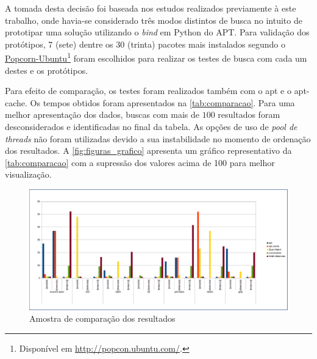 
A tomada desta decisão foi baseada nos estudos realizados previamente à este trabalho, onde havia-se considerado três modos distintos de busca no intuito de prototipar uma solução utilizando o \textit{bind} em Python do {\code APT}.
Para validação dos protótipos, 7 (sete) dentre os 30 (trinta) pacotes mais instalados segundo o \href{http://popcon.ubuntu.com/}{Popcorn-Ubuntu}\footnote{Disponível em \url{http://popcon.ubuntu.com/}.} foram escolhidos para realizar os testes de busca com cada um destes e os protótipos. 

Para efeito de comparação, os testes foram realizados também com o {\code apt} e o {\code apt-cache}. Os tempos obtidos foram apresentados na \autoref{tab:comparacao}. Para uma melhor apresentação dos dados, buscas com mais de $100$  resultados foram desconsiderados e identificadas no final da tabela. As opções de uso de \textit{pool de threads} não foram utilizadas devido a sua instabilidade no momento de ordenação dos resultados.
A \autoref{fig:figuras_grafico} apresenta um gráfico representativo da \autoref{tab:comparacao} com a supressão dos valores acima de 100  para melhor visualização.

\begin{figure}[htbp]
  \centering
	\includegraphics[width=\textwidth,angle=0]{figuras/grafico}
  \caption{Amostra de comparação dos resultados}
  \label{fig:figuras_grafico}
\end{figure}


